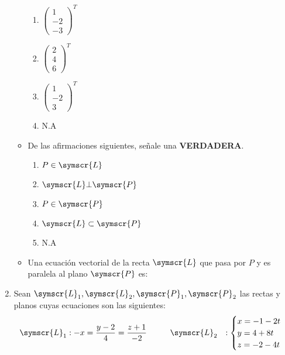 \documentclass{article}
\def\fancyL{\symscr{L}}
\def\fancyP{\symscr{P}}
\begin{document}
\begin{enumerate}
\begin{itemize}
\begin{enumerate}[label=\listAlph]
					\item \(\begin{pmatrix}1 \\ -2 \\ -3\end{pmatrix}^T\)
					\item \(\begin{pmatrix}2 \\ 4 \\ 6\end{pmatrix}^T\)
					\item \(\begin{pmatrix}1 \\ -2 \\ 3\end{pmatrix}^T\)
					\item N.A
                \end{enumerate}
            \item De las afirmaciones siguientes, señale una \textbf{VERDADERA}.
                \begin{enumerate}
                    \item \(P \in \fancyL\)
                    \item \(\fancyL \bot \fancyP\)
                    \item \(P \in \fancyP\)
                    \item \(\fancyL \subset \fancyP\)
                    \item N.A
                \end{enumerate}
            \item Una ecuación vectorial de la recta \(\fancyL\) que pasa por \(P\) y es paralela al plano \(\fancyP\) es:
        \end{itemize}
\setcounter{enumi}{20}
\item Sean \(\fancyL_1, \fancyL_2, \fancyP_1, \fancyP_2\) las rectas y planos cuyas ecuaciones son las siguientes:
    \[
        \begin{aligned}
            \fancyL_1 &: -x = \frac{y - 2}{4} = \frac{z + 1}{-2}
            \hspace{1cm}
            \fancyL_2 &: 
            \begin{cases}
                x = -1 -2t \\
                y = 4 +8t \\ 
                z = -2 -4t \\
            \end{cases} \\

\end{aligned}\]
\end{enumerate}
\end{document}
